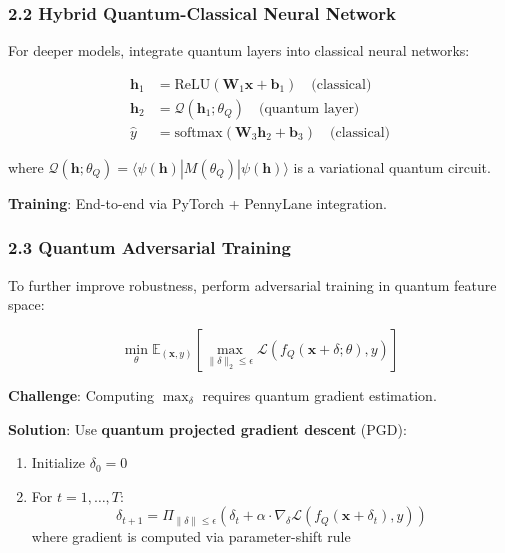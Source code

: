 \documentclass[11pt]{article}
\begin{document}
\subsubsection{2.2 Hybrid Quantum-Classical Neural Network}

For deeper models, integrate quantum layers into classical neural networks:

\begin{equation}
\begin{aligned}
\mathbf{h}_1 &= \text{ReLU}(\mathbf{W}_1 \mathbf{x} + \mathbf{b}_1) \quad \text{(classical)} \\
\mathbf{h}_2 &= \mathcal{Q}(\mathbf{h}_1; \theta_Q) \quad \text{(quantum layer)} \\
\hat{y} &= \text{softmax}(\mathbf{W}_3 \mathbf{h}_2 + \mathbf{b}_3) \quad \text{(classical)}
\end{aligned}
\end{equation}

where $\mathcal{Q}(\mathbf{h}; \theta_Q) = \langle \psi(\mathbf{h}) | M(\theta_Q) | \psi(\mathbf{h}) \rangle$ is a variational quantum circuit.

\textbf{Training}: End-to-end via PyTorch + PennyLane integration.

\subsubsection{2.3 Quantum Adversarial Training}

To further improve robustness, perform adversarial training in quantum feature space:

\begin{equation}
\min_\theta \mathbb{E}_{(\mathbf{x}, y)} \left[ \max_{\|\delta\|_2 \leq \epsilon} \mathcal{L}\left( f_Q(\mathbf{x} + \delta; \theta), y \right) \right]
\end{equation}

\textbf{Challenge}: Computing $\max_\delta$ requires quantum gradient estimation.

\textbf{Solution}: Use \textbf{quantum projected gradient descent} (PGD):
\begin{enumerate}
    \item Initialize $\delta_0 = 0$
    \item For $t = 1, \ldots, T$:
    \begin{equation}
    \delta_{t+1} = \Pi_{\|\delta\| \leq \epsilon} \left( \delta_t + \alpha \cdot \nabla_\delta \mathcal{L}(f_Q(\mathbf{x} + \delta_t), y) \right)
    \end{equation}
    where gradient is computed via parameter-shift rule
\end{enumerate}
\end{document}
